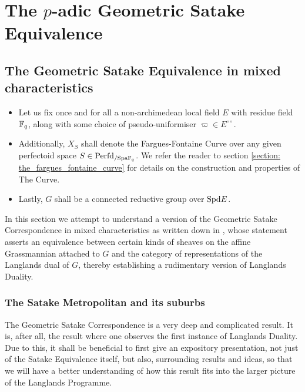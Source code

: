 \chapter{The \texorpdfstring{$p$}{}-adic Geometric Satake Equivalence}
    \begin{abstract}
        
    \end{abstract}
    
    \minitoc
    
    \section{The Geometric Satake Equivalence in mixed characteristics}
        \begin{convention} \label{conv: p_adic_geometric_satake_conventions}
            \noindent
            \begin{itemize}
                \item Let us fix once and for all a non-archimedean local field $E$ with residue field $\mathbb{F}_q$, along with some choice of pseudo-uniformiser $\varpi \in E^{\circ \circ}$. 
                \item Additionally, $X_S$ shall denote the Fargues-Fontaine Curve over any given perfectoid space $S \in \mathrm{Perfd}_{/\mathrm{Spa} \mathbb{F}_q}$. We refer the reader to section \ref{section: the_fargues_fontaine_curve} for details on the construction and properties of The Curve. 
                \item Lastly, $G$ shall be a connected reductive group over $\mathrm{Spd} E$.
            \end{itemize}
        \end{convention}
        
        In this section we attempt to understand a version of the Geometric Satake Correspondence in mixed characteristics as written down in \cite{fargues_scholze_geometrization_of_local_langlands}, whose statement asserts an equivalence between certain kinds of sheaves on the affine Grassmannian attached to $G$ and the category of representations of the Langlands dual of $G$, thereby establishing a rudimentary version of Langlands Duality. 
        
        \subsection{The Satake Metropolitan and its suburbs}
            The Geometric Satake Correspondence is a very deep and complicated result. It is, after all, the result where one observes the first instance of Langlands Duality. Due to this, it shall be beneficial to first give an expository presentation, not just of the Satake Equivalence itself, but also, surrounding results and ideas, so that we will have a better understanding of how this result fits into the larger picture of the Langlands Programme.
            
